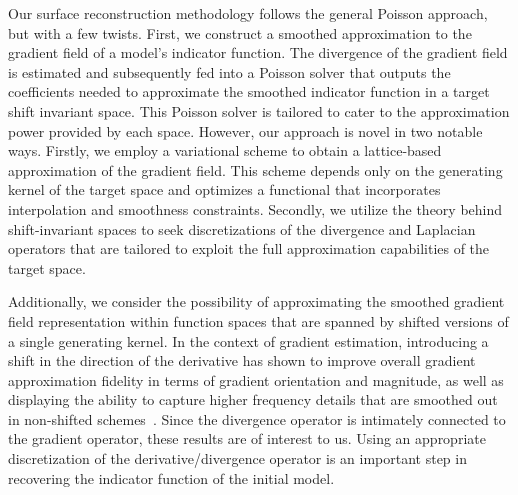 Our surface reconstruction methodology follows the general Poisson approach, but with a few twists. First, we construct a smoothed approximation to the gradient field of a model's indicator function. The divergence of the gradient field is estimated and subsequently fed into a Poisson solver that outputs the coefficients needed to approximate the smoothed indicator function in a target shift invariant space. This Poisson solver is tailored to cater to the approximation power provided by each space. However, our approach is novel in two notable ways. Firstly, we employ a variational scheme to obtain a lattice-based approximation of the gradient field. This scheme depends only on the generating kernel of the target space and optimizes a functional that incorporates interpolation and smoothness constraints. Secondly, we utilize the theory behind shift-invariant spaces to seek discretizations of the divergence and Laplacian operators that are tailored to exploit the full approximation capabilities of the target space.

Additionally, we consider the possibility of approximating the smoothed gradient field representation within function spaces that are
spanned by shifted versions of a single generating kernel. In the context of gradient estimation, introducing a shift in the direction
of the derivative has shown to improve overall gradient approximation fidelity in terms of gradient orientation and magnitude,
as well as displaying the ability to capture higher frequency details that are smoothed out in non-shifted schemes~\cite{gradrev}. Since the divergence operator is intimately connected to the gradient operator, these results are of interest to us. Using an appropriate discretization of the derivative/divergence operator is an important step in recovering the indicator function of the initial model. 

